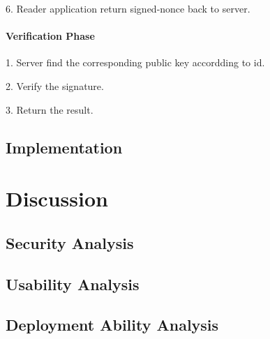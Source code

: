 \begin{CJK}{Bg5}{bsmi}
	6. Reader application return signed-nonce back to server.

\subsubsection{Verification Phase}

	1. Server find the corresponding public key accordding to id.

	2. Verify the signature.

	3. Return the result.

\section{Implementation}


\chapter{Discussion}

\section{Security Analysis}

\begin{comment}
This is the most important part of an authentication system.
We have to define our threat model before we start to analyze.
There are 4 components in the scheme I proposed.
\end{comment}

\section{Usability Analysis}

\begin{comment}
The usability can not be neglected when researchers trying to design a system.
Usability is a subjective perception, it may be different from person to person.
The following paragragh states the criterias I used to estimate the usability of a system.
\end{comment}

\section{Deployment Ability Analysis}

\begin{comment}
The deployment ability is also an important thing which is need to be considered, especially in designing an authentication system.
A system with high usability means it is friendly to users; a system with high deployment ability means it is friendly to the system provider or, more precise, the developers.
The following paragraph states the criterias I used to estimate a system's deployment ability. 
\end{comment}


\end{CJK}
